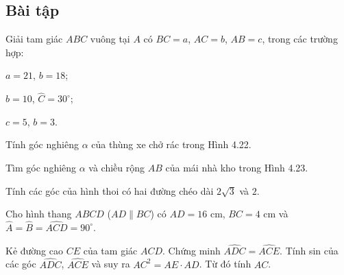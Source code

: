 \begin{exercises}
    \subsection{Bài tập}

    \begin{questions}[resume=SGK]
        \item Giải tam giác $ABC$ vuông tại $A$ có $BC=a$, $AC=b$, $AB=c$, trong các trường hợp:
        \begin{questions}
            \item $a=21$, $b=18$;

            \answerline
            \answerline
            \answerline
            \item $b=10$, $\widehat{C}=30^\circ$;

            \answerline
            \answerline
            \answerline
            \item $c=5$, $b=3$.

            \answerline
            \answerline
            \answerline
        \end{questions}

        \item Tính góc nghiêng $\alpha$ của thùng xe chở rác trong Hình 4.22.

        \answerline
        \answerline

        \item Tìm góc nghiêng $\alpha$ và chiều rộng $AB$ của mái nhà kho trong Hình 4.23.

        \answerline
        \answerline

        \item Tính các góc của hình thoi có hai đường chéo dài $2\sqrt{3}$ và $2$.

        \answerline
        \answerline

        \item Cho hình thang $ABCD$ ($AD\parallel BC$) có $AD=16$ cm, $BC=4$ cm và $\widehat{A}=\widehat{B}=\widehat{ACD}=90^\circ$.
        \begin{questions}
            \item Kẻ đường cao $CE$ của tam giác $ACD$. Chứng minh $\widehat{ADC}=\widehat{ACE}$. Tính sin của các góc $\widehat{ADC}$, $\widehat{ACE}$ và suy ra $AC^2=AE\cdot AD$. Từ đó tính $AC$.


\end{questions}
\end{questions}
\end{exercises}
